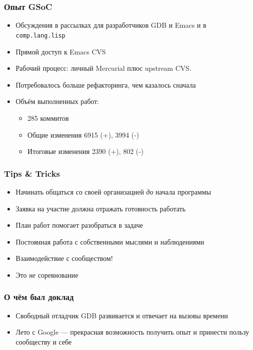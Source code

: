 \documentclass[onlymath]{beamer}
\begin{document}
\begin{frame}[fragile]
  \frametitle{Опыт GSoC}
  \begin{itemize}
  \item Обсуждения в рассылках для разработчиков GDB и Emacs и в {\tt
      comp.lang.lisp}
  \item Прямой доступ к Emacs CVS
  \item Рабочий процесс: личный Mercurial плюс upstream CVS.
  \item Потребовалось больше рефакторинга, чем казалось сначала

  \item Объём выполненных работ:
    \begin{itemize}
    \item 285 коммитов
    \item Общие изменения {\color{green!50!black}6915 (+)},
      {\color{red!50!black}3994 (-)}
    \item Итоговые изменения {\color{green!50!black}2390 (+)},
      {\color{red!50!black}802 (-)}
    \end{itemize}

  \end{itemize}
\end{frame}

\begin{frame}
  \frametitle{Tips \& Tricks}
  \begin{itemize}
  \item Начинать общаться со своей организацией \emph{до} начала программы
    
  \item Заявка на участие должна отражать готовность работать

  \item План работ помогает разобраться в задаче
    
  \item Постоянная работа с собственными мыслями и наблюдениями
    
  \item Взаимодействие с сообществом!

  \item Это \emph{не} соревнование
  \end{itemize}
\end{frame}

\appendix
\begin{frame}
  \frametitle{О чём был доклад}
  \begin{itemize}
  \item Свободный отладчик GDB развивается и отвечает на вызовы
    времени
  \item Лето с Google — прекрасная возможность получить опыт и
    принести пользу сообществу и себе
  \end{itemize}
\end{frame}
\end{document}
